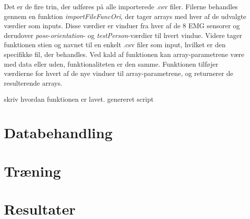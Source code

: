 Det er de fire trin, der udføres på alle importerede .csv filer. Filerne behandles gennem en funktion \textit{importFileFuncOri}, der tager arrays med hver af de udvalgte værdier som inputs. Disse værdier er vinduer fra hver af de 8 EMG sensorer og derudover \textit{pose}-\textit{orientation}- og \textit{testPerson}-værdier til hvert vindue. Videre tager funktionen stien og navnet til en enkelt .csv filer som input, hvilket er den specifikke fil, der behandles. Ved kald af funktionen kan array-parametrene være med data eller uden, funktionaliteten er den samme. Funktionen tilføjer værdierne for hvert af de nye vinduer til array-parametrene, og returnerer de resulterende arrays. 


skriv hvordan funktionen er lavet. genereret script



\section{Databehandling}

\section{Træning}

\section{Resultater}